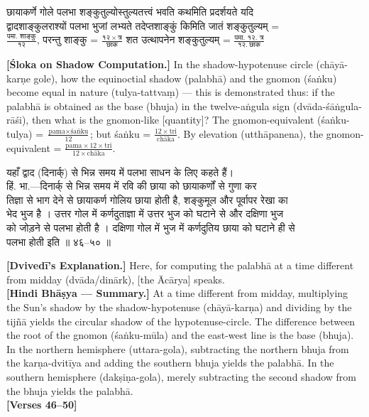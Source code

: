 \documentclass[11pt,a4paper]{article}
\newcommand{\dev}[1]{{\devanagarifont #1}}
\newcommand{\bilingualpair}[2]{%
  \noindent%
  \begin{minipage}[t]{0.48\textwidth}
    #1%
  \end{minipage}%
  \hfill%
  \begin{minipage}[t]{0.48\textwidth}
    #2%
  \end{minipage}%
  \par\vspace{0.5em}%
}
\newenvironment{sanskritcol}{\devanagarifont\small}{}
\newenvironment{englishcol}{\iastfont\small}{}
\begin{document}
\bilingualpair{%
\begin{sanskritcol}
\dev{छायाकर्णे गोले पलभा शङ्कुतुल्योस्तुल्यतत्त्वं भवति कथमिति प्रदर्शयते यदि}\\[0.3em]
\dev{द्वादशाङ्कुलराश्यों पलभा भुजां लभ्यते तदेप्तशाङ्कुं किमिति जातं शङ्कुतुल्यम् =}\\[0.3em]
\dev{$\frac{\text{पमा. शाङ्कु}}{१२}$, परन्तु शाङ्कु = $\frac{१२ \times \text{त्र}}{\text{छाक}}$ शत उत्थापनेन शङ्कुतुल्यम् = $\frac{\text{पमा. १२. त्र}}{१२.\ \text{छाक}}$}
\end{sanskritcol}%
}{%
\begin{englishcol}
\textbf{[Śloka on Shadow Computation.]} In the shadow-\-hypotenuse circle (chāyā-karṇe gole), how the equinoctial shadow (palabhā) and the gnomon (\'saṅku) become equal in nature (tulya-tattvaṃ) --- this is demonstrated thus: if the palabhā is obtained as the base (bhuja) in the twelve-\-aṅgula sign (dvāda-\'sāṅgula-rāśi), then what is the gnomon-\-like [quantity]? The gnomon-\-equivalent (\'saṅku-tulya) = $\frac{\text{pama} \times \text{\'saṅku}}{12}$; but \'saṅku = $\frac{12 \times \text{tri}}{\text{chāka}}$. By elevation (utthāpanena), the gnomon-\-equivalent = $\frac{\text{pama} \times 12 \times \text{tri}}{12 \times \text{chāka}}$.
\end{englishcol}%
}

\vspace{0.3cm}
\bilingualpair{%
\begin{sanskritcol}
\dev{यहाँ द्वाद (दिनार्क्) से भिन्न समय में पलभा साधन के लिए कहते हैं।}\\[0.3em]
\dev{हिं. भा.---दिनार्क् से भिन्न समय में रवि की छाया को छायाकर्णों से गुणा कर}\\[0.3em]
\dev{तिज्ञा से भाग देने से छायाकर्ण गोलिय छाया होती है, शङ्कुमूल और पूर्वापर रेखा का}\\[0.3em]
\dev{भेद भुज है । उत्तर गोल में कर्णदुताज्ञा में उत्तर भुज को घटाने से और दक्षिणा भुज}\\[0.3em]
\dev{को जोड़ने से पलभा होती है । दक्षिणा गोल में भुज में कर्णदुतिय छाया को घटाने ही से}\\[0.3em]
\dev{पलभा होती इति ॥ ४६--५० ॥}
\end{sanskritcol}%
}{%
\begin{englishcol}
\textbf{[Dvivedī's Explanation.]} Here, for computing the palabhā at a time different from midday (dvāda/dinārk), [the Ācārya] speaks.\\[0.3em]
\textbf{[Hindi Bhāṣya --- Summary.]} At a time different from midday, multiplying the Sun's shadow by the shadow-\-hypotenuse (chāyā-karṇa) and dividing by the tijñā yields the circular shadow of the hypotenuse-\-circle. The difference between the root of the gnomon (\'saṅku-mūla) and the east-\-west line is the base (bhuja). In the northern hemisphere (uttara-gola), subtracting the northern bhuja from the karṇa-dvitīya and adding the southern bhuja yields the palabhā. In the southern hemisphere (dakṣiṇa-gola), merely subtracting the second shadow from the bhuja yields the palabhā.\\[0.3em]
\hfill \textbf{[Verses 46--50]}
\end{englishcol}%
}
\end{document}
